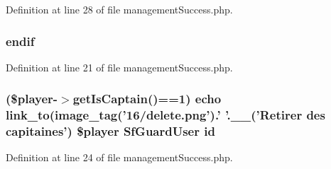 Definition at line 28 of file management\-Success.\-php.

\hypertarget{live_2modules_2team_2templates_2management_success_8php_a82cd33ca97ff99f2fcc5e9c81d65251b}{
\subsubsection[{endif}]{\setlength{\rightskip}{0pt plus 5cm}endif}}\label{live_2modules_2team_2templates_2management_success_8php_a82cd33ca97ff99f2fcc5e9c81d65251b}


Definition at line 21 of file management\-Success.\-php.

\hypertarget{live_2modules_2team_2templates_2management_success_8php_ad9851c94d15b310fef9eaded57c23ddf}{
\subsubsection[{id}]{ (\$player-\/$>$get\-Is\-Captain()==1) echo link\-\_\-to(image\-\_\-tag('16/delete.\-png').' '.\-\_\-\-\_\-('Retirer des capitaines') \$player Sf\-Guard\-User id}}\label{live_2modules_2team_2templates_2management_success_8php_ad9851c94d15b310fef9eaded57c23ddf}


Definition at line 24 of file management\-Success.\-php.

